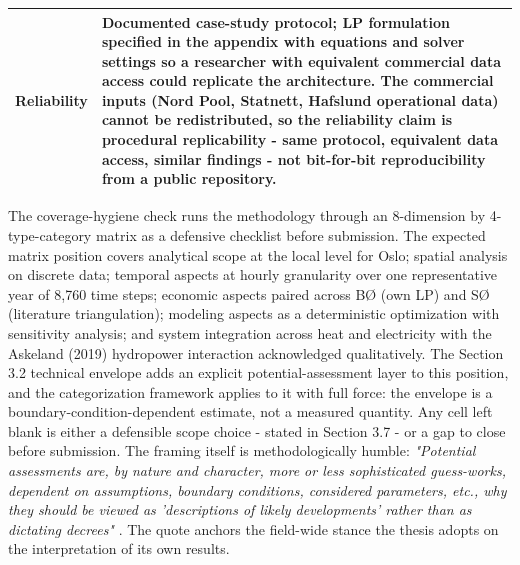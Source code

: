 \begin{table}[h]
\begin{tabular}{p{3.5cm} p{10cm}}
\addlinespace
Reliability &
Documented case-study protocol; LP formulation specified in the appendix with equations and solver settings so a researcher with equivalent commercial data access could replicate the architecture. The commercial inputs (Nord Pool, Statnett, Hafslund operational data) cannot be redistributed, so the reliability claim is procedural replicability - same protocol, equivalent data access, similar findings - not bit-for-bit reproducibility from a public repository. \\
\bottomrule
\end{tabular}
\label{tab:3.6 validity tests}
\end{table}

The coverage-hygiene check runs the methodology through an 8-dimension by 4-type-category matrix as a defensive checklist before submission. The expected matrix position covers analytical scope at the local level for Oslo; spatial analysis on discrete data; temporal aspects at hourly granularity over one representative year of 8,760 time steps; economic aspects paired across BØ (own LP) and SØ (literature triangulation); modeling aspects as a deterministic optimization with sensitivity analysis; and system integration across heat and electricity with the Askeland (2019) hydropower interaction acknowledged qualitatively. The Section 3.2 technical envelope adds an explicit potential-assessment layer to this position, and the categorization framework applies to it with full force: the envelope is a boundary-condition-dependent estimate, not a measured quantity. Any cell left blank is either a defensible scope choice - stated in Section 3.7 - or a gap to close before submission. The framing itself is methodologically humble: \emph{"Potential assessments are, by nature and character, more or less sophisticated guess-works, dependent on assumptions, boundary conditions, considered parameters, etc., why they should be viewed as 'descriptions of likely developments' rather than as dictating decrees"} \cite{atabaki_systematic_2025}. The quote anchors the field-wide stance the thesis adopts on the interpretation of its own results.

